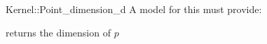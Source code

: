 \begin{ccRefFunctionObjectConcept}{Kernel::Point_dimension_d}
A model for this must provide:


 {returns the dimension of $p$}

\end{ccRefFunctionObjectConcept}

